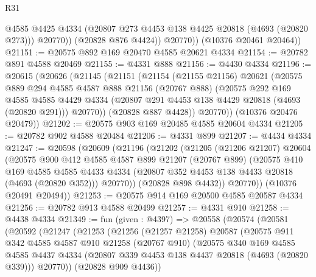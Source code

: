 \begin{lexlean}{R31}
\begin{coremodule}
                @4585
                @4425
                @4334
                (@20807 @273 @4453 @138 @4425 @20818 (@4693 (@20820 @273)))
                @20770))
            (@20828 @876 @4424))
          @20770))
      (@10376 @20461 @20464))
@21151 := @20575 @892 @169 @20470 @4585 @20621 @4334
@21154 := @20782 @891 @4588 @20469
@21155 := @4331 @888
@21156 := @4430 @4334
@21196 := @20615
    (@20626
      (@21145
        (@21151
          (@21154
            (@21155 @21156)
            @20621
            (@20575
              @889
              @294
              @4585
              @4587
              @888
              @21156
              (@20767 @888)
              (@20575
                @292
                @169
                @4585
                @4585
                @4429
                @4334
                (@20807 @291 @4453 @138 @4429 @20818 (@4693 (@20820 @291)))
                @20770))
            (@20828 @887 @4428))
          @20770))
      (@10376 @20476 @20479))
@21202 := @20575 @903 @169 @20485 @4585 @20604 @4334
@21205 := @20782 @902 @4588 @20484
@21206 := @4331 @899
@21207 := @4434 @4334
@21247 := @20598
    (@20609
      (@21196
        (@21202
          (@21205
            (@21206 @21207)
            @20604
            (@20575
              @900
              @412
              @4585
              @4587
              @899
              @21207
              (@20767 @899)
              (@20575
                @410
                @169
                @4585
                @4585
                @4433
                @4334
                (@20807 @352 @4453 @138 @4433 @20818 (@4693 (@20820 @352)))
                @20770))
            (@20828 @898 @4432))
          @20770))
      (@10376 @20491 @20494))
@21253 := @20575 @914 @169 @20500 @4585 @20587 @4334
@21256 := @20782 @913 @4588 @20499
@21257 := @4331 @910
@21258 := @4438 @4334
@21349 := fun (given : @4397) =>
  @20558
    (@20574
      (@20581
        (@20592
          (@21247
            (@21253
              (@21256
                (@21257 @21258)
                @20587
                (@20575
                  @911
                  @342
                  @4585
                  @4587
                  @910
                  @21258
                  (@20767 @910)
                  (@20575
                    @340
                    @169
                    @4585
                    @4585
                    @4437
                    @4334
                    (@20807 @339 @4453 @138 @4437 @20818 (@4693 (@20820 @339)))
                    @20770))
                (@20828 @909 @4436))

\end{coremodule}
\end{lexlean}
